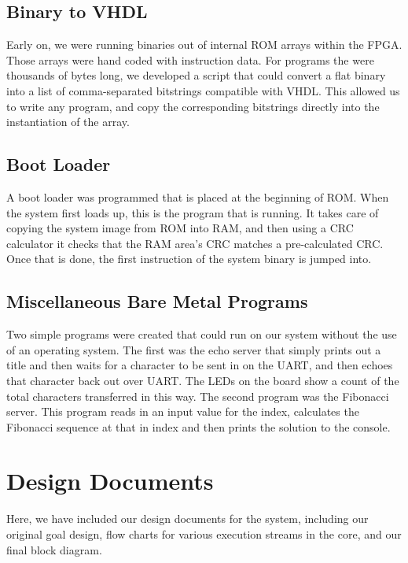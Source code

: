 \documentclass{article}
\begin{document}
    \subsection{Binary to VHDL}
    Early on, we were running binaries out of internal ROM arrays within the FPGA. Those arrays were hand coded with instruction data. For programs the were thousands of bytes long, we developed a script that could convert a flat binary into a list of comma-separated bitstrings compatible with VHDL.  This allowed us to write any program, and copy the corresponding bitstrings directly into the instantiation of the array.
    
    \subsection{ Boot Loader}
    A boot loader was programmed that is placed at the beginning of ROM. When the system first loads up, this is the program that is running. It takes care of copying the system image from ROM into RAM, and then using a CRC calculator it checks that the RAM area's CRC matches a pre-calculated CRC. Once that is done, the first instruction of the system binary is jumped into.
    
    \subsection{ Miscellaneous Bare Metal Programs}
    Two simple programs were created that could run on our system without the use of an operating system. The first was the echo server that simply prints out a title and then waits for a character to be sent in on the UART, and then echoes that character back out over UART. The LEDs on the board show a count of the total characters transferred in this way. The second program was the Fibonacci server. This program reads in an input value for the index, calculates the Fibonacci sequence at that in index and then prints the solution to the console.

\section{Design Documents}
Here, we have included our design documents for the system, including our original goal design, flow charts for various execution streams in the core, and our final block diagram.
\end{document}

